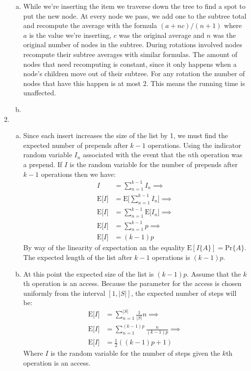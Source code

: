 \documentclass[letterpaper,10pt]{article}
\begin{document}
\begin{enumerate}
\begin{enumerate}[a)]
		\item While we're inserting the item we traverse down the tree to find a spot to put the new node. At every node we pass, we add one to the subtree total and recompute the average with the formula $(a + nc)/(n+1)$ where $a$ is the value we're inserting, $c$ was the original average and $n$ was the original number of nodes in the subtree. During rotations involved nodes recompute their subtree averages with similar formulas. The amount of nodes that need recomputing is constant, since it only happens when a node's children move out of their subtree. For any rotation the number of nodes that have this happen is at most 2. This means the running time is unaffected.

		\item
	\end{enumerate}
	\clearpage

	\item

	\begin{enumerate}[a)]
		\item Since each insert increases the size of the list by 1, we must find the expected number of prepends after $k-1$ operations. Using the indicator random variable $I_{n}$ associated with the event that the $n$th operation was a prepend. If $I$ is the random variable for the number of prepends after $k-1$ operations then we have:
		\begin{align*}
			I & = \sum^{k-1}_{n=1} I_n \implies \\
			\text{E}\big[I\big] & = \text{E}\Bigg[ \sum^{k-1}_{n=1} I_n \Bigg] \implies \\
			\text{E}\big[I\big] & = \sum^{k-1}_{n=1} \text{E}\big[ I_n \big] \implies \\
			\text{E}\big[I\big] & = \sum^{k-1}_{n=1} p \implies \\
			\text{E}\big[I\big] & =  (k-1)p
		\end{align*}
		By way of the linearity of expectation an the equality $\text{E}[I\{A\}] = \text{Pr}\{A\}$.
		The expected length of the list after $k-1$ operations is $(k-1)p$.
		\item At this point the expected size of the list is $(k-1)p$. Assume that the $k$th operation is an access. Because the parameter for the access is chosen uniformly from the interval $[1,|S|]$, the expected number of steps will be:
		\begin{align*}
			\text{E}\big[I\big] & = \sum^{|S|}_{n=1} \frac{1}{|S|} n \implies \\
			\text{E}\big[I\big] & = \sum^{(k-1)p}_{n=1} \frac{n}{(k-1)p} \implies \\
			\text{E}\big[I\big] & = \frac{1}{2} ((k-1)p + 1)
		\end{align*}
		Where $I$ is the random variable for the number of steps given the $k$th operation is an access.


\end{enumerate}
\end{enumerate}
\end{document}
